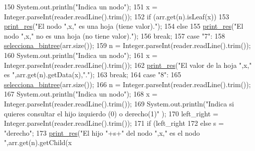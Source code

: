 \begin{DoxyCode}
150                         System.out.println(\textcolor{stringliteral}{"Indica un nodo"});
151                         x = Integer.parseInt(reader.readLine().trim());
152                         \textcolor{keywordflow}{if} (arr.get(n).isLeaf(x))
153                             \hyperlink{classdomini_1_1utils_1_1Driver____BinTree_a434e26afb3eb701558d81b0fd1c29dcb}{print\_res}(\textcolor{stringliteral}{"El nodo "},x,\textcolor{stringliteral}{" es una hoja (tiene valor)."});
154                         \textcolor{keywordflow}{else} 
155                             \hyperlink{classdomini_1_1utils_1_1Driver____BinTree_a434e26afb3eb701558d81b0fd1c29dcb}{print\_res}(\textcolor{stringliteral}{"El nodo "},x,\textcolor{stringliteral}{" no es una hoja (no tiene valor)."});
156                     \textcolor{keywordflow}{break};
157                     \textcolor{keywordflow}{case} \textcolor{stringliteral}{"7"}:
158                         \hyperlink{classdomini_1_1utils_1_1Driver____BinTree_a0d90bf2cb928174547e712140b5a4fe5}{selecciona\_bintree}(arr.size());
159                         n = Integer.parseInt(reader.readLine().trim());
160                         System.out.println(\textcolor{stringliteral}{"Indica un nodo"});
161                         x = Integer.parseInt(reader.readLine().trim());
162                         \hyperlink{classdomini_1_1utils_1_1Driver____BinTree_a434e26afb3eb701558d81b0fd1c29dcb}{print\_res}(\textcolor{stringliteral}{"El valor de la hoja "},x,\textcolor{stringliteral}{" es "},arr.get(n).getData(x),\textcolor{stringliteral}{"."});
163                     \textcolor{keywordflow}{break};
164                     \textcolor{keywordflow}{case} \textcolor{stringliteral}{"8"}:
165                         \hyperlink{classdomini_1_1utils_1_1Driver____BinTree_a0d90bf2cb928174547e712140b5a4fe5}{selecciona\_bintree}(arr.size());
166                         n = Integer.parseInt(reader.readLine().trim());
167                         System.out.println(\textcolor{stringliteral}{"Indica un nodo"});
168                         x = Integer.parseInt(reader.readLine().trim());
169                         System.out.println(\textcolor{stringliteral}{"Indica si quieres consultar el hijo izquierdo (0) o derecho(1)"}
      );
170                         left\_right = Integer.parseInt(reader.readLine().trim());
171                         \textcolor{keywordflow}{if} (left\_right%
172                         \textcolor{keywordflow}{else} s = \textcolor{stringliteral}{"derecho"};
173                         \hyperlink{classdomini_1_1utils_1_1Driver____BinTree_a434e26afb3eb701558d81b0fd1c29dcb}{print\_res}(\textcolor{stringliteral}{"El hijo "}+s+\textcolor{stringliteral}{" del nodo "},x,\textcolor{stringliteral}{" es el nodo "},arr.get(n).getChild(x

\end{DoxyCode}
